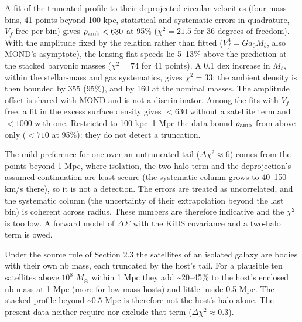 \documentclass[
  10pt,
]{article}
\begin{document}
A fit of the truncated profile to their deprojected circular velocities (four mass bins, 41 points beyond 100 kpc, statistical and systematic errors in quadrature, $V_f$ free per bin) gives $\rho_{\rm amb}<630$ at 95\% ($\chi^2=21.5$ for 36 degrees of freedom). With the amplitude fixed by the relation rather than fitted ($V_f^4=Ga_0M_b$, also MOND's asymptote), the lensing flat speeds lie 5--13\% above the prediction at the stacked baryonic masses ($\chi^2=74$ for 41 points). A 0.1 dex increase in $M_b$, within the stellar-mass and gas systematics, gives $\chi^2=33$; the ambient density is then bounded by 355 (95\%), and by 160 at the nominal masses. The amplitude offset is shared with MOND and is not a discriminator. Among the fits with $V_f$ free, a fit in the excess surface density gives $<630$ without a satellite term and $<1000$ with one. Restricted to 100 kpc--1 Mpc the data bound $\rho_{\rm amb}$ from above only ($<710$ at 95\%): they do not detect a truncation.

The mild preference for one over an untruncated tail ($\Delta\chi^2\approx6$) comes from the points beyond 1 Mpc, where isolation, the two-halo term and the deprojection's assumed continuation are least secure (the systematic column grows to 40--150 km/s there), so it is not a detection. The errors are treated as uncorrelated, and the systematic column (the uncertainty of their extrapolation beyond the last bin) is coherent across radius. These numbers are therefore indicative and the $\chi^2$ is too low. A forward model of $\Delta\Sigma$ with the KiDS covariance and a two-halo term is owed.

Under the source rule of Section 2.3 the satellites of an isolated galaxy are bodies with their own nb mass, each truncated by the host's tail. For a plausible ten satellites above $10^{8}$ $M_\odot$ within 1 Mpc they add \textasciitilde{}20--45\% to the host's enclosed nb mass at 1 Mpc (more for low-mass hosts) and little inside 0.5 Mpc. The stacked profile beyond \textasciitilde{}0.5 Mpc is therefore not the host's halo alone. The present data neither require nor exclude that term ($\Delta\chi^2\approx0.3$).
\end{document}
